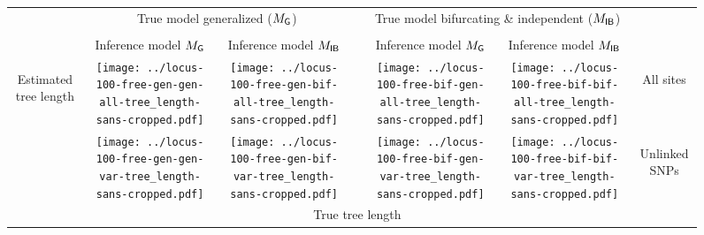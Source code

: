 \documentclass[border=10pt,varwidth=30cm]{standalone}
\newcommand{\genmodel}{\ensuremath{M_{\textrm{\sffamily G}}}\xspace}
\newcommand{\bimodel}{\ensuremath{M_{\textrm{\sffamily IB}}}\xspace}
\begin{document}
\begin{figure}
    \setlength\arrayrulewidth{2pt}
    \centering
    \begin{tabular}{@{}ccccccc@{}}
        & \multicolumn{2}{c}{\LARGE True model generalized (\genmodel)}
        &
        & \multicolumn{2}{c}{\LARGE True model bifurcating \& independent (\bimodel)}
        & \\[1ex]
        \cline{2-3}\cline{5-6}
        & & & & & & \\
        & \multirow{1}{0.19\textwidth}{\centering\Large Inference model \genmodel}
        & \multirow{1}{0.19\textwidth}{\centering\Large Inference model \bimodel}
        &
        & \multirow{1}{0.19\textwidth}{\centering\Large Inference model \genmodel}
        & \multirow{1}{0.19\textwidth}{\centering\Large Inference model \bimodel}
        & \\[4ex]
        \multirow{2}{*}[5em]{\begin{sideways}\Large Estimated tree length\end{sideways}}
        & \texttt{[image: ../locus-100-free-gen-gen-all-tree\_length-sans-cropped.pdf]}
        & \texttt{[image: ../locus-100-free-gen-bif-all-tree\_length-sans-cropped.pdf]}
        &
        & \texttt{[image: ../locus-100-free-bif-gen-all-tree\_length-sans-cropped.pdf]}
        & \texttt{[image: ../locus-100-free-bif-bif-all-tree\_length-sans-cropped.pdf]}
        & \multirow{1}{*}[9em]{\begin{sideways}\Large All sites\end{sideways}} \\
        & \texttt{[image: ../locus-100-free-gen-gen-var-tree\_length-sans-cropped.pdf]}
        & \texttt{[image: ../locus-100-free-gen-bif-var-tree\_length-sans-cropped.pdf]}
        &
        & \texttt{[image: ../locus-100-free-bif-gen-var-tree\_length-sans-cropped.pdf]}
        & \texttt{[image: ../locus-100-free-bif-bif-var-tree\_length-sans-cropped.pdf]}
        & \multirow{1}{*}[10em]{\begin{sideways}\Large Unlinked SNPs\end{sideways}} \\
        & \multicolumn{5}{c}{\Large True tree length} & \\
    \end{tabular}
\end{figure}
\end{document}
